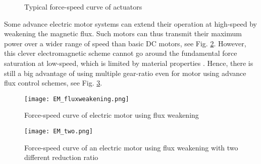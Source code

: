 \begin{figure}[htb]
        \centering
        \caption{Typical force-speed curve of actuators}\label{fig:powercurves}
\end{figure}

Some advance electric motor systems can extend their operation at high-speed by weakening the magnetic flux. Such motors can thus transmit their maximum power over a wider range of speed than basic DC motors, see Fig. \ref{fig:EM_fluxweakening}. However, this clever electromagnetic scheme cannot go around the fundamental force saturation at low-speed, which is limited by material properties \cite{hollerbach_comparative_1992}. Hence, there is still a big advantage of using multiple gear-ratio even for motor using advance flux control schemes, see Fig. \ref{fig:EM_two}. 

\begin{figure}[htp]
	\centering
		\texttt{[image: EM\_fluxweakening.png]}
	\caption{Force-speed curve of electric motor using flux weakening }
	\label{fig:EM_fluxweakening}
\end{figure}

\begin{figure}[htp]
	\centering
		\texttt{[image: EM\_two.png]}
	\caption{Force-speed curve of an electric motor using flux weakening with two different reduction ratio}
	\label{fig:EM_two}
\end{figure}


